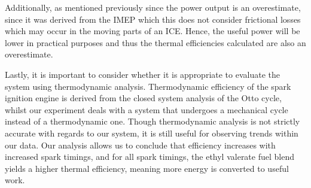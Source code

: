 \documentclass[11pt]{article}
\begin{document}
Additionally, as mentioned previously since the power output is an overestimate, since it was derived from the IMEP which this does not consider frictional losses which may occur in the moving parts of an ICE. Hence, the useful power will be lower in practical purposes and thus the thermal efficiencies calculated are also an overestimate. 

Lastly, it is important to consider whether it is appropriate to evaluate the system using thermodynamic analysis. Thermodynamic efficiency of the spark ignition engine is derived from the closed system analysis of the Otto cycle, whilst our experiment deals with a system that undergoes a mechanical cycle instead of a thermodynamic one. Though thermodynamic analysis is not strictly accurate with regards to our system, it is still useful for observing trends within our data. Our analysis allows us to conclude that efficiency increases with increased spark timings, and for all spark timings, the ethyl valerate fuel blend yields a higher thermal efficiency, meaning more energy is converted to useful work.  
\end{document}

